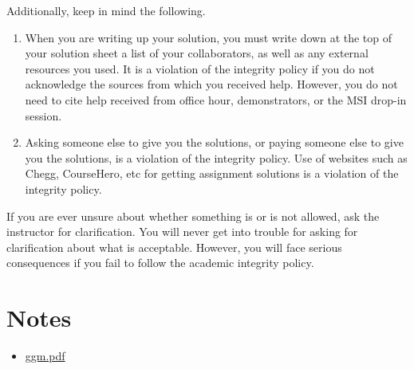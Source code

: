\documentclass{amsart}
\begin{document}
Additionally, keep in mind the following.
\begin{enumerate}
\item When you are writing up your solution, you must write down at the top of your solution sheet a list of your collaborators, as well as any external resources you used.
It is a violation of the integrity policy if you do not acknowledge the sources from which you received help.
However, you do not need to cite help received from office hour, demonstrators, or the MSI drop-in session.
\item Asking someone else to give you the solutions, or paying someone else to give you the solutions, is a violation of the integrity policy. Use of websites such as Chegg, CourseHero, etc for getting assignment solutions is a violation of the integrity policy.
\end{enumerate}

If you are ever unsure about whether something is or is not allowed, ask the instructor for clarification.
You will never get into trouble for asking for clarification about what is acceptable.
However, you will face serious consequences if you fail to follow the academic integrity policy.
\section{Notes}
\label{sec:org770aea5}
\begin{itemize}
\item \href{./ggm.pdf}{ggm.pdf}
\end{itemize}
\end{document}

